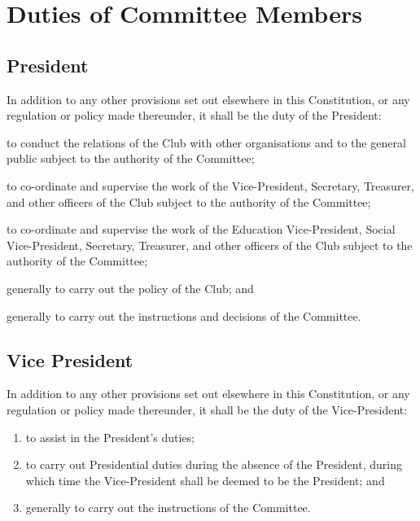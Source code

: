 \documentclass[11pt]{article} %
\begin{document}
\section{Duties of Committee Members}
\subsection{President}
In addition to any other provisions set out elsewhere in this Constitution, or any regulation or policy made thereunder, it shall be the duty of the President:
\begin{enumerate}
	\item to conduct the relations of the Club with other organisations and to the general public subject to the authority of the Committee;
	{\color{red} \item to co-ordinate and supervise the work of the Vice-President, Secretary, Treasurer, and other officers of the Club subject to the authority of the Committee;}
	{\color{ForestGreen} \item to co-ordinate and supervise the work of the Education Vice-President, Social Vice-President, Secretary, Treasurer, and other officers of the Club subject to the authority of the Committee;}
	\item generally to carry out the policy of the Club; and
	\item generally to carry out the instructions and decisions of the Committee.
\end{enumerate}

{\color{red} \subsection{Vice President}
In addition to any other provisions set out elsewhere in this Constitution, or any regulation or policy made thereunder, it shall be the duty of the Vice-President:
\begin{enumerate}
	\item to assist in the President's duties;
	\item to carry out Presidential duties during the absence of the President, during which time the Vice-President shall be deemed to be the President; and
	\item generally to carry out the instructions of the Committee.
\end{enumerate}}
\end{document}
